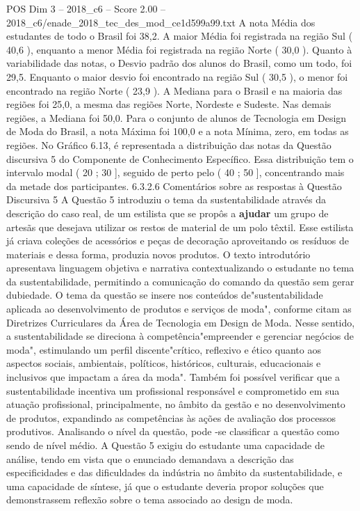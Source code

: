 \begin{textsample}{POS Dim 3 – 2018\_c6 – Score 2.00 – 2018\_c6/enade\_2018\_tec\_des\_mod\_ce1d599a99.txt}
A nota Média dos estudantes de todo o Brasil foi 38,2.
A maior Média foi registrada na região Sul ( 40,6 ), enquanto a menor Média foi registrada na região Norte ( 30,0 ).
Quanto à variabilidade das notas, o Desvio padrão dos alunos do Brasil, como um todo, foi 29,5.
Enquanto o maior desvio foi encontrado na região Sul ( 30,5 ), o menor foi encontrado na região Norte ( 23,9 ).
A Mediana para o Brasil e na maioria das regiões foi 25,0, a mesma das regiões Norte, Nordeste e Sudeste.
Nas demais regiões, a Mediana foi 50,0.
Para o conjunto de alunos de Tecnologia em Design de Moda do Brasil, a nota Máxima foi 100,0 e a nota Mínima, zero, em todas as regiões.
No Gráfico 6.13, é representada a distribuição das notas da Questão discursiva 5 do Componente de Conhecimento Específico.
Essa distribuição tem o intervalo modal ( 20 ; 30 ], seguido de perto pelo ( 40 ; 50 ], concentrando mais da metade dos participantes. 6.3.2.6 Comentários sobre as respostas à Questão Discursiva 5 A Questão 5 introduziu o tema da sustentabilidade através da descrição do caso real, de um estilista que se propôs a \textbf{ajudar} um grupo de artesãs que desejava utilizar os restos de material de um polo têxtil.
Esse estilista já criava coleções de acessórios e peças de decoração aproveitando os resíduos de materiais e dessa forma, produzia novos produtos.
O texto introdutório apresentava linguagem objetiva e narrativa contextualizando o estudante no tema da sustentabilidade, permitindo a comunicação do comando da questão sem gerar dubiedade.
O tema da questão se insere nos conteúdos de"sustentabilidade aplicada ao desenvolvimento de produtos e serviços de moda", conforme citam as Diretrizes Curriculares da Área de Tecnologia em Design de Moda.
Nesse sentido, a sustentabilidade se direciona à competência"empreender e gerenciar negócios de moda", estimulando um perfil discente"crítico, reflexivo e ético quanto aos aspectos sociais, ambientais, políticos, históricos, culturais, educacionais e inclusivos que impactam a área da moda".
Também foi possível verificar que a sustentabilidade incentiva um profissional responsável e comprometido em sua atuação profissional, principalmente, no âmbito da gestão e no desenvolvimento de produtos, expandindo as competências às ações de avaliação dos processos produtivos.
Analisando o nível da questão, pode -se classificar a questão como sendo de nível médio.
A Questão 5 exigiu do estudante uma capacidade de análise, tendo em vista que o enunciado demandava a descrição das especificidades e das dificuldades da indústria no âmbito da sustentabilidade, e uma capacidade de síntese, já que o estudante deveria propor soluções que demonstrassem reflexão sobre o tema associado ao design de moda.

\end{textsample}
